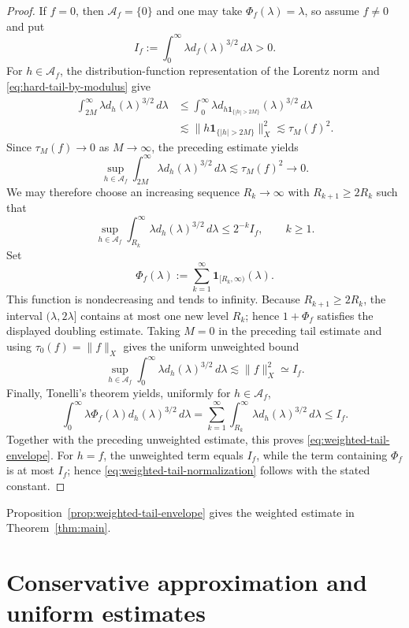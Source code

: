 \documentclass[11pt,reqno]{amsproc}
\newcommand{\one}{\mathbf 1}
\newcommand{\dd}{\,d}
\newcommand{\rev}[1]{#1}
\begin{document}
\begin{proof}
If $f=0$, then $\mathcal A_f=\{0\}$ and one may take
$\Phi_f(\lambda)=\lambda$, so assume $f\ne0$ and put
\[
  I_f:=\int_0^\infty \lambda d_f(\lambda)^{3/2}\dd\lambda>0.
\]
For $h\in\mathcal A_f$, the distribution-function representation of the
Lorentz norm and \eqref{eq:hard-tail-by-modulus} give
\begin{align*}
  \int_{2M}^\infty \lambda d_h(\lambda)^{3/2}\dd\lambda
  &\le
  \int_0^\infty
  \lambda d_{h\one_{\{|h|>2M\}}}(\lambda)^{3/2}\dd\lambda \\
  &\lesssim
  \|h\one_{\{|h|>2M\}}\|_X^2
  \lesssim \tau_M(f)^2.
\end{align*}
Since $\tau_M(f)\to0$ as $M\to\infty$, the preceding estimate yields
\[
  \sup_{h\in\mathcal A_f}
  \int_{2M}^\infty
  \lambda d_h(\lambda)^{3/2}\dd\lambda
  \lesssim \tau_M(f)^2
  \longrightarrow0.
\]
We may therefore choose an increasing sequence $R_k\to\infty$ with
$R_{k+1}\ge2R_k$ such that
\[
  \sup_{h\in\mathcal A_f}
  \int_{R_k}^\infty \lambda d_h(\lambda)^{3/2}\dd\lambda
  \le2^{-k}I_f,
  \qquad k\ge1.
\]
Set
\[
  \Phi_f(\lambda)
  :=\sum_{k=1}^\infty\one_{[R_k,\infty)}(\lambda).
\]
This function is nondecreasing and tends to infinity.  Because
$R_{k+1}\ge2R_k$, the interval $(\lambda,2\lambda]$ contains at most one new
level $R_k$; hence $1+\Phi_f$ satisfies the displayed doubling estimate.
\rev{Taking $M=0$ in the preceding tail estimate and using
$\tau_0(f)=\|f\|_X$ gives the uniform unweighted bound}
\[
 \rev{\sup_{h\in\mathcal A_f}
 \int_0^\infty\lambda d_h(\lambda)^{3/2}\dd\lambda
 \lesssim \|f\|_X^2\simeq I_f.}
\]
Finally, Tonelli's theorem yields, uniformly for $h\in\mathcal A_f$,
\[
  \int_0^\infty \lambda\Phi_f(\lambda)
  d_h(\lambda)^{3/2}\dd\lambda
  =\sum_{k=1}^\infty
  \int_{R_k}^\infty \lambda d_h(\lambda)^{3/2}\dd\lambda
  \le I_f.
\]
\rev{Together with the preceding unweighted estimate, this proves
\eqref{eq:weighted-tail-envelope}.  For $h=f$, the unweighted term equals
$I_f$, while the term containing $\Phi_f$ is at most $I_f$; hence
\eqref{eq:weighted-tail-normalization} follows with the stated constant.}
\end{proof}



Proposition~\ref{prop:weighted-tail-envelope} gives the weighted estimate in
Theorem~\ref{thm:main}.

\section{Conservative approximation and uniform estimates}
\label{sec:approximation}
\end{document}
